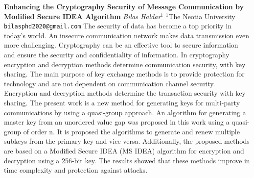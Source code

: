 
    \begin{conf-abstract}[]
        {\textbf{Enhancing the Cryptography Security of Message Communication by Modified Secure IDEA Algorithm}}
        {\textit{Bilas Haldar$^{1}$}}
        {$^{1}$The Neotia University}
        {\texttt{bilasphd2020@gmail.com}}
        {The security of data has become a top priority in today's world. An insecure communication network makes data transmission even more challenging. Cryptography can be an effective tool to secure information and ensure the security and confidentiality of information. In cryptography encryption and decryption methods determine communication security, with key sharing. The main purpose of key exchange methods is to provide protection for technology and are not dependent on communication channel security. Encryption and decryption methods determine the transaction security with key sharing. The present work is a new method for generating keys for multi-party communications by using a quasi-group approach. An algorithm for generating a master key from an unordered value gap was proposed in this work using a quasi-group of order n. It is proposed the algorithms to generate and renew multiple subkeys from the primary key and vice versa. Additionally, the proposed methods are based on a Modified Secure IDEA (MS IDEA) algorithm for encryption and decryption using a 256-bit key.  The results showed that these methods improve in time complexity and protection against attacks.}
    \end{conf-abstract}
        